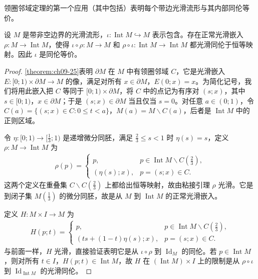 \documentclass[../../main.tex]{subfiles}
\begin{document}
领圈邻域定理的第一个应用（其中包括）表明每个带边光滑流形与其内部同伦等价。

\begin{theorem}\label{theorem:ch09-26}
设 $M$ 是带非空边界的光滑流形，$\iota\colon\operatorname{Int}M\hookrightarrow M$ 表示包含。存在正常光滑嵌入 $\rho\colon M\to\operatorname{Int}M$，使得 $\iota\circ\rho\colon M\to M$ 和 $\rho\circ\iota\colon\operatorname{Int}M\to\operatorname{Int}M$ 都光滑同伦于恒等映射。因此 $\iota$ 是同伦等价。
\end{theorem}

\begin{proof}
\cref{theorem:ch09-25}表明 $\partial M$ 在 $M$ 中有领圈邻域 $C$，它是光滑嵌入 $E\colon[0;1)\times\partial M\to M$ 的像，满足对所有 $x\in\partial M$，$E(0;x)=x$。为简化记号，我们将用此嵌入把 $C$ 等同于 $[0;1)\times\partial M$，将 $C$ 中的点记为有序对 $(s;x)$，其中 $s\in[0;1)$，$x\in\partial M$；于是 $(s;x)\in\partial M$ 当且仅当 $s=0$。对任意 $a\in(0;1)$，令 $C(a)=\{(s;x)\in C:0\leqslant t<a\}$，$M(a)=M\smallsetminus C(a)$，后者是 $\operatorname{Int}M$ 中的正则区域。

令 $\eta\colon[0;1)\to[\frac13;1)$ 是递增微分同胚，满足 $\frac23\leqslant s<1$ 时 $\eta(s)=s$，定义 $\rho\colon M\to\operatorname{Int}M$ 为
\begin{align*}
\rho(p)=
\begin{cases}
p, & p\in\operatorname{Int}M\smallsetminus C(\frac23),\\
(\eta(s);x), & p=(s;x)\in C.
\end{cases}
\end{align*}
这两个定义在重叠集 $C\smallsetminus C(\frac23)$ 上都给出恒等映射，故由粘接引理 $\rho$ 光滑。它是到闭子集 $M(\frac13)$ 的微分同胚，故是从 $M$ 到 $\operatorname{Int}M$ 的正常光滑嵌入。

定义 $H\colon M\times I\to M$ 为
\begin{align*}
H(p;t)=
\begin{cases}
p, & p\in\operatorname{Int}M\smallsetminus C(\frac23),\\
(ts+(1-t)\eta(s);x), & p=(s;x)\in C.
\end{cases}
\end{align*}
与前面一样，$H$ 光滑，直接验证表明它是从 $\iota\circ\rho$ 到 $\operatorname{Id}_M$ 的同伦。若 $p\in\operatorname{Int}M$，则对所有 $t\in I$，$H(p;t)\in\operatorname{Int}M$，故 $H$ 在 $(\operatorname{Int}M)\times I$ 上的限制是从 $\rho\circ\iota$ 到 $\operatorname{Id}_{\operatorname{Int}M}$ 的光滑同伦。
\end{proof}
\end{document}
